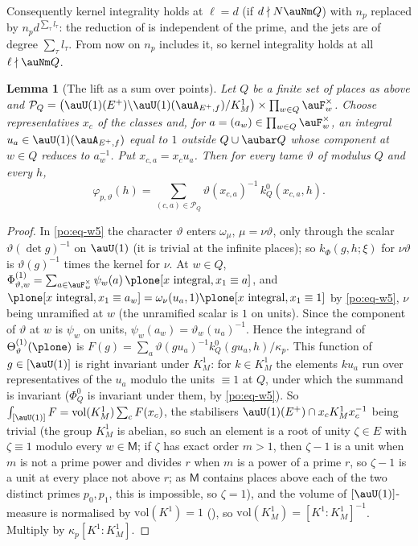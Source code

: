 \documentclass[10pt]{amsart}
\newtheorem{lemma}[theorem]{Lemma}
\theoremstyle{definition}
\theoremstyle{remark}
\begin{document}
Consequently kernel integrality holds at $\ell=d$ (if $d\nmid N\auNm Q$) with $n_p$ replaced by
$n_pd^{\sum_\tau l_\tau}$: the reduction of {\cite[Proposition~5.30]{P49}} is independent of the prime, and the
jets are of degree $\sum_\tau l_\tau$. From now on $n_p$ includes it, so kernel integrality
holds at all $\ell\nmid\auNm Q$.

\begin{lemma}[The lift as a sum over points]\label{pex:points}
Let $Q$ be a finite set of places as above and $\mathcal P_Q=\bigl(\auU(1)(E^+)\backslash
\auU(1)(\auA_{E^+,f})/K^1_M\bigr)\times\prod_{w\in Q}\auF_w^\times$. Choose representatives $x_c$ of
the classes and, for $a=(a_w)\in\prod_{w\in Q}\auF_w^\times$, an integral $u_a\in\auU(1)(\auA_{E^+,f})$
equal to $1$ outside $Q\cup\aubar Q$ whose component at $w\in Q$ reduces to $a_w^{-1}$. Put
$x_{c,a}=x_cu_a$. Then for every tame $\vartheta$ of modulus $Q$ and every $h$,
\[
\varphi_{p,\vartheta}(h)=\sum_{(c,a)\in\mathcal P_Q}\vartheta(x_{c,a})^{-1}\,k^0_Q(x_{c,a},h).
\]
\end{lemma}
\begin{proof}
In \eqref{po:eq-w5} the character $\vartheta$ enters $\omega_\mu$, $\mu=\nu\vartheta$, only through
the scalar $\vartheta(\det g)^{-1}$ on $\auU(1)$ (it is trivial at the infinite places); so
$k_{\Phi}(g,h;\xi)$ for $\nu\vartheta$ is $\vartheta(g)^{-1}$ times the kernel for $\nu$. At $w\in Q$,
$\Phi^{(1)}_{\vartheta,w}=\sum_{a\in\auF_w^\times}\psi_w(a)\,\plone[x\text{ integral},x_1\equiv a]$, and
$\plone[x\text{ integral},x_1\equiv a_w]=\omega_\nu(u_a,1)\plone[x\text{ integral},x_1\equiv1]$ by
\eqref{po:eq-w5}, $\nu$ being unramified at $w$ (the unramified scalar is $1$ on units). Since the
component of $\vartheta$ at $w$ is $\psi_w$ on units, $\psi_w(a_w)=\vartheta_w(u_a)^{-1}$. Hence the
integrand of $\Theta^{(1)}_\vartheta(\plone)$ is $F(g)=\sum_a\vartheta(gu_a)^{-1}k^0_Q(gu_a,h)/\kappa_p$.
This function of $g\in[\auU(1)]$ is right invariant under $K^1_M$: for $k\in K^1_M$ the elements $ku_a$
run over representatives of the $u_a$ modulo the units $\equiv1$ at $Q$, under which the summand is
invariant ($\Phi^0_Q$ is invariant under them, by \eqref{po:eq-w5}). So $\int_{[\auU(1)]}F=
\mathrm{vol}(K^1_M)\sum_cF(x_c)$, the stabilisers $\auU(1)(E^+)\cap x_cK^1_Mx_c^{-1}$ being trivial
(the group $K^1_M$ is abelian, so such an element is a root of unity $\zeta\in E$ with $\zeta\equiv1$
modulo every $w\in\mathsf M$; if $\zeta$ has exact order $m>1$, then $\zeta-1$ is a unit when $m$ is not a
prime power and divides $r$ when $m$ is a power of a prime $r$, so $\zeta-1$ is a unit at every place
not above $r$; as $\mathsf M$ contains places above each of the two distinct primes $p_0,p_1$, this is
impossible, so $\zeta=1$), and
the volume of $[\auU(1)]$-measure is normalised by $\mathrm{vol}(K^1)=1$ ({\cite[\S2.3]{P53}}), so
$\mathrm{vol}(K^1_M)=[K^1:K^1_M]^{-1}$. Multiply by $\kappa_p[K^1:K^1_M]$.
\end{proof}
\end{document}
